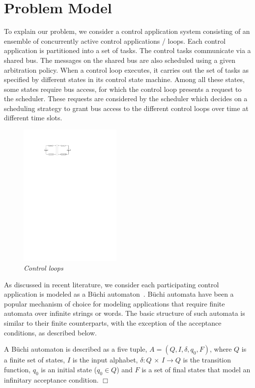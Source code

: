 \section{Problem Model} \label{sec3}
\noindent
To explain our problem, we consider a control application system consisting of an ensemble of concurrently active control applications / loops. Each control application is partitioned into a set of
tasks. The control tasks communicate via a shared bus. The messages on the shared bus are also scheduled using a given arbitration policy. When a control loop executes, it carries out the set of 
tasks as specified by different states in its control state machine. Among all these states, some
states require bus access, for which the control loop presents a request to the scheduler.
These requests are considered by the scheduler which decides on a scheduling strategy to grant bus access to the different control loops over time at different time slots. \\

\begin{figure}
\begin{center}
\includegraphics[width=50mm]{control_diagram.pdf}
\end{center}
\vspace{-0.1in}
\caption{{\em Control loops}}
\label{state}
\end{figure}

\noindent
As discussed in recent literature, we consider each participating control application is modeled as a B\"{u}chi automaton~\cite{leeuwen90/Thomas90}. 
B\"{u}chi automata have been a popular mechanism of choice for modeling applications that require finite automata over infinite strings or words.
The basic structure of such automata is similar to their finite counterparts, with the exception of the acceptance conditions, as described below.
\begin{definition}
A B\"{u}chi automaton is described as a five tuple, 
$A = (Q,I,\delta,q_0,F)$, where $Q$ is a finite set of states, $I$ is the input alphabet, $\delta : Q$ $\times$ $I \rightarrow Q $ is the transition function, $q_0$ 
is an initial state ($q_0 \in Q$) and $F$ is a set of final states that model an infinitary acceptance condition. $\Box$ 
\end{definition}

